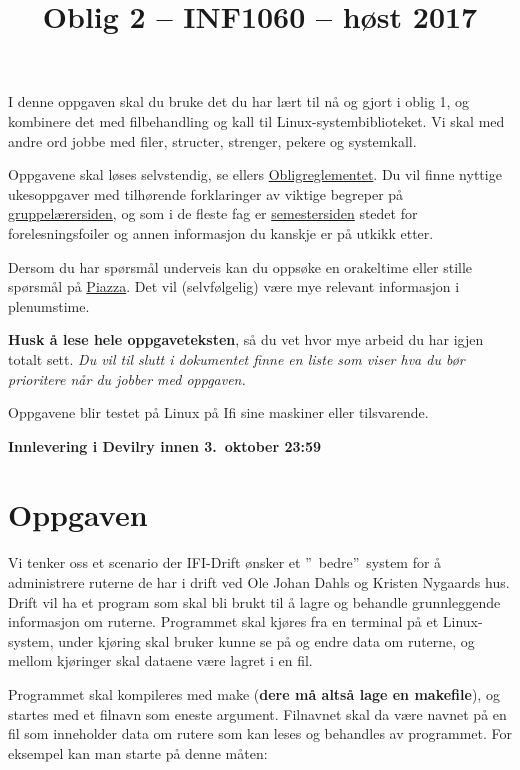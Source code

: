 \documentclass[norsk]{article}
\title{Oblig 2 -- INF1060 -- høst 2017}
\date{}
\begin{document}
\maketitle
\noindent I denne oppgaven skal du bruke det du har lært til nå og gjort i oblig 1, og kombinere det med filbehandling og kall til Linux-systembiblioteket. Vi skal med andre ord jobbe med filer, structer, strenger, pekere og systemkall.

Oppgavene skal løses selvstendig, se ellers \href{http://www.uio.no/studier/admin/obligatoriske-aktiviteter/mn-ifi-oblig.html}{Obligreglementet}. Du vil finne nyttige ukesoppgaver med tilhørende forklaringer av viktige begreper på  \href{http://folk.uio.no/hpkragse/INF1060/index.html}{gruppelærersiden}, og som i de fleste fag er \href{http://www.uio.no/studier/emner/matnat/ifi/INF1060/h17}{semestersiden} stedet for forelesningsfoiler og annen informasjon du kanskje er på utkikk etter.

Dersom du har spørsmål underveis kan du oppsøke en orakeltime eller stille spørsmål på \href{http://www.piazza.com/class}{Piazza}. Det vil (selvfølgelig) være mye relevant informasjon i plenumstime.

\textbf{Husk å lese hele oppgaveteksten}, så du vet hvor mye arbeid du har igjen totalt sett. \textit{Du vil til slutt i dokumentet finne en liste som viser hva du bør prioritere når du jobber med oppgaven.}

Oppgavene blir testet på Linux på Ifi sine maskiner eller tilsvarende.

\textbf{Innlevering i Devilry innen 3.\ oktober 23:59}

\section*{Oppgaven}

Vi tenker oss et scenario der IFI-Drift ønsker et \textquotedblright~bedre\textquotedblright~system for å administrere ruterne de har i drift ved Ole Johan Dahls og Kristen Nygaards hus. Drift vil ha et program som skal bli brukt til å lagre og behandle grunnleggende informasjon om ruterne. Programmet skal kjøres fra en terminal på et Linux-system, under kjøring skal bruker kunne se på og endre data om ruterne, og mellom kjøringer skal dataene være lagret i en fil.

Programmet skal kompileres med make (\textbf{dere må altså lage en makefile}), og startes med et filnavn som eneste argument. Filnavnet skal da være navnet på en fil som inneholder data om rutere som kan leses og behandles av programmet. For eksempel kan man starte på denne måten:
\end{document}
